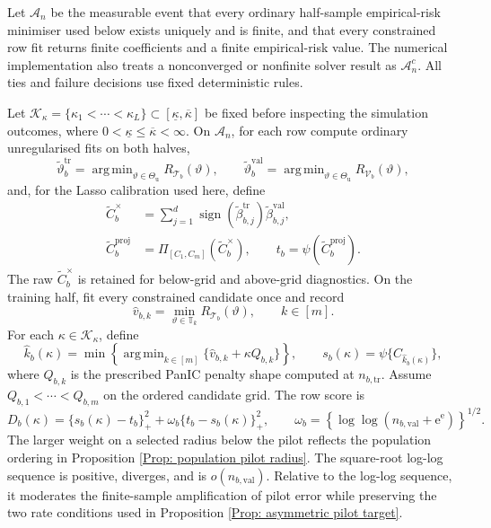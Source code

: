 \documentclass[12pt]{article}
\DeclareMathOperator*{\argmin}{arg\,min}
\newenvironment{bluechange}{\begingroup\color[rgb]{0.00,0.00,1.00}}{\endgroup}
\theoremstyle{remark}
\theoremstyle{plain}
\begin{document}
\begin{bluechange}
Let $\mathcal A_n$ be the measurable event that every ordinary half-sample empirical-risk minimiser used below exists uniquely and is finite, and that every constrained row fit returns finite coefficients and a finite empirical-risk value. The numerical implementation also treats a nonconverged or nonfinite solver result as $\mathcal A_n^c$. All ties and failure decisions use fixed deterministic rules.

Let $\mathcal K_\kappa=\{\kappa_1<\cdots<\kappa_L\}\subset[\underline\kappa,\overline\kappa]$ be fixed before inspecting the simulation outcomes, where $0<\underline\kappa\le\overline\kappa<\infty$. On $\mathcal A_n$, for each row compute ordinary unregularised fits on both halves,
\[
\widetilde\vartheta_b^{\mathrm{tr}}
=\argmin_{\vartheta\in\Theta_{\mathrm u}}R_{\mathcal T_b}(\vartheta),
\qquad
\widetilde\vartheta_b^{\mathrm{val}}
=\argmin_{\vartheta\in\Theta_{\mathrm u}}R_{\mathcal V_b}(\vartheta),
\]
and, for the Lasso calibration used here, define
\begin{align*}
\widetilde C_b^{\times}
&=\sum_{j=1}^d
\operatorname{sign}(\widetilde\beta_{b,j}^{\mathrm{tr}})
\widetilde\beta_{b,j}^{\mathrm{val}},\\
\widetilde C_b^{\mathrm{proj}}
&=\Pi_{[C_1,C_m]}(\widetilde C_b^{\times}),
\qquad
t_b=\psi(\widetilde C_b^{\mathrm{proj}}).
\end{align*}
The raw $\widetilde C_b^{\times}$ is retained for below-grid and above-grid diagnostics. On the training half, fit every constrained candidate once and record
\[
\widehat v_{b,k}=\min_{\vartheta\in\mathbb T_k}R_{\mathcal T_b}(\vartheta),
\qquad k\in[m].
\]
For each $\kappa\in\mathcal K_\kappa$, define
\[
\widehat k_b(\kappa)
=\min\left\{\argmin_{k\in[m]}
\{\widehat v_{b,k}+\kappa Q_{b,k}\}\right\},
\qquad
s_b(\kappa)=\psi\{C_{\widehat k_b(\kappa)}\},
\]
where $Q_{b,k}$ is the prescribed PanIC penalty shape computed at $n_{b,\mathrm{tr}}$. Assume $Q_{b,1}<\cdots<Q_{b,m}$ on the ordered candidate grid. The row score is
\begin{equation}\label{Eqs: fold radius discrepancy}
D_b(\kappa)
=\{s_b(\kappa)-t_b\}_+^2
+\omega_b\{t_b-s_b(\kappa)\}_+^2,
\qquad
\omega_b=
\left\{
\log\!\log(n_{b,\mathrm{val}}+\mathrm e^{\mathrm e})
\right\}^{1/2}.
\end{equation}
The larger weight on a selected radius below the pilot reflects the population ordering in Proposition \ref{Prop: population pilot radius}. The square-root log-log sequence is positive, diverges, and is $o(n_{b,\mathrm{val}})$. Relative to the log-log sequence, it moderates the finite-sample amplification of pilot error while preserving the two rate conditions used in Proposition \ref{Prop: asymmetric pilot target}.


\end{bluechange}
\end{document}
